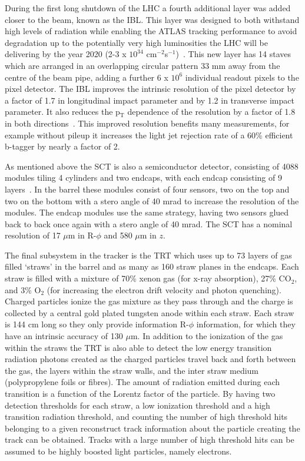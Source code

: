 During the first long shutdown of the LHC a fourth additional layer was added closer to the beam, known as the \gls{IBL}.  
This layer was designed to both withstand high levels of radiation while enabling the ATLAS tracking performance to avoid degradation up to the potentially very high luminosities the LHC will be delivering by the year 2020 (2-3 x $10^{34}$ cm$^{-2}$s$^{-1}$)~\cite{IBL1}.  
This new layer has 14 staves which are arranged in an overlapping circular pattern 33 mm away from the centre of the beam pipe, adding a further 6 x $10^{6}$ individual readout pixels to the pixel detector.  
The IBL improves the intrinsic resolution of the pixel detector by a factor of 1.7 in longitudinal impact parameter and by 1.2 in transverse impact parameter.  
It also reduces the p$_{\mathrm{T}}$ dependence of the resolution by a factor of 1.8 in both directions~\cite{IBL2}.  
This improved resolution benefits many measurements, for example without pileup it increases the light jet rejection rate of a 60\% efficient b-tagger by nearly a factor of 2.  

As mentioned above the \gls{SCT} is also a semiconductor detector, consisting of 4088 modules tiling 4 cylinders and two endcaps, with each endcap consisting of 9 layers~\cite{JOIATLAS}.  
In the barrel these modules consist of four sensors, two on the top and two on the bottom with a stero angle of 40 mrad to increase the resolution of the modules.  
The endcap modules use the same strategy, having two sensors glued back to back once again with a stero angle of 40 mrad.  
The SCT has a nominal resolution of 17 $\mu$m in R-$\phi$ and 580 $\mu$m in $z$.  

The final subsystem in the tracker is the TRT which uses up to 73 layers of gas filled `straws' in the barrel and as many as 160 straw planes in the endcaps.  
Each straw is filled with a mixture of 70\% xenon gas (for x-ray absorption), 27\% CO$_{2}$, and 3\% O$_{2}$ (for increasing the electron drift velocity and photon quenching).  
Charged particles ionize the gas mixture as they pass through and the charge is collected by a central gold plated tungsten anode within each straw.  
Each straw is 144 cm long so they only provide information R-$\phi$ information, for which they have an intrinsic accuracy of 130 $\mu$m.  
In addition to the ionization of the gas within the straws the TRT is also able to detect the low energy transition radiation photons created as the charged particles travel back and forth between the gas, the layers within the straw walls, and the inter straw medium (polypropylene foils or fibres).  
The amount of radiation emitted during each transition is a function of the Lorentz factor of the particle.  
By having two detection thresholds for each straw, a low ionization threshold and a high transition radiation threshold, and counting the number of high threshold hits belonging to a given reconstruct track information about the particle creating the track can be obtained.  
Tracks with a large number of high threshold hits can be assumed to be highly boosted light particles, namely electrons.  


